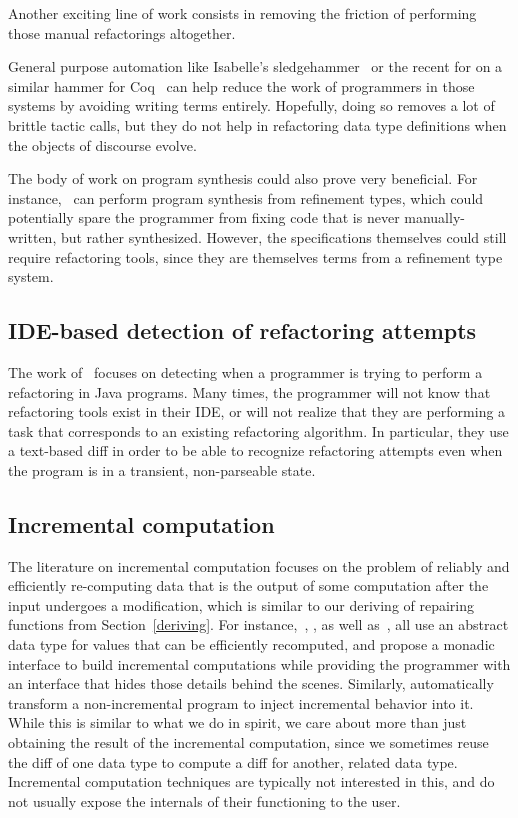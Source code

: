Another exciting line of work consists in removing the friction of performing
those manual refactorings altogether.

General purpose automation like Isabelle's sledgehammer~\citet{blanchette2011}
or the recent for on a similar hammer for Coq~\citet{czajka2017} can help reduce
the work of programmers in those systems by avoiding writing terms entirely.
Hopefully, doing so removes a lot of brittle tactic calls, but they do not help
in refactoring data type definitions when the objects of discourse evolve.

The body of work on program synthesis could also prove very beneficial.  For
instance,~\cite{polikarpova2016} can perform program synthesis from refinement
types, which could potentially spare the programmer from fixing code that is
never manually-written, but rather synthesized.  However, the specifications
themselves could still require refactoring tools, since they are themselves
terms from a refinement type system.

\subsection*{IDE-based detection of refactoring attempts}

The work of~\citet{foster2012} focuses on detecting when a programmer is trying
to perform a refactoring in Java programs.  Many times, the programmer will not
know that refactoring tools exist in their IDE, or will not realize that they
are performing a task that corresponds to an existing refactoring algorithm.  In
particular, they use a text-based diff in order to be able to recognize
refactoring attempts even when the program is in a transient, non-parseable
state.

\subsection*{Incremental computation}

The literature on incremental computation focuses on the problem of reliably and
efficiently re-computing data that is the output of some computation after the
input undergoes a modification, which is similar to our deriving of repairing
functions from Section~\ref{deriving}.  For instance,~\citet{acar2006},
\citet{carlsson2002}, as well as~\citet{firsov2016}, all use an abstract data
type for values that can be efficiently recomputed, and propose a monadic
interface to build incremental computations while providing the programmer with
an interface that hides those details behind the scenes.  Similarly,
\citet{chen2011} automatically transform a non-incremental program to inject
incremental behavior into it.  While this is similar to what we do in spirit,
we care about more than just obtaining the result of the incremental
computation, since we sometimes reuse the diff of one data type to compute a diff
for another, related data type.  Incremental computation techniques are
typically not interested in this, and do not usually expose the internals of
their functioning to the user.


